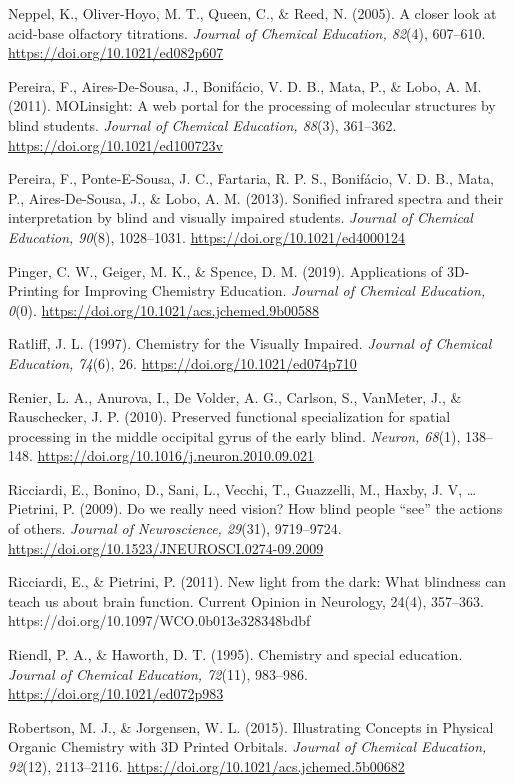 \documentclass[11.5pt]{sig-alternate} %
\begin{document}
Neppel, K., Oliver-Hoyo, M. T., Queen, C., \& Reed, N. (2005). A closer look at acid-base olfactory titrations. \textit{Journal of Chemical Education, 82}(4), 607–610. \url{https://doi.org/10.1021/ed082p607}

Pereira, F., Aires-De-Sousa, J., Bonifácio, V. D. B., Mata, P., \& Lobo, A. M. (2011). MOLinsight: A web portal for the processing of molecular structures by blind students. \textit{Journal of Chemical Education, 88}(3), 361–362. \url{https://doi.org/10.1021/ed100723v}

Pereira, F., Ponte-E-Sousa, J. C., Fartaria, R. P. S., Bonifácio, V. D. B., Mata, P., Aires-De-Sousa, J., \& Lobo, A. M. (2013). Sonified infrared spectra and their interpretation by blind and visually impaired students. \textit{Journal of Chemical Education, 90}(8), 1028–1031. \url{https://doi.org/10.1021/ed4000124}

Pinger, C. W., Geiger, M. K., \& Spence, D. M. (2019). Applications of 3D-Printing for Improving Chemistry Education. \textit{Journal of Chemical Education, 0}(0). \url{https://doi.org/10.1021/acs.jchemed.9b00588}

Ratliff, J. L. (1997). Chemistry for the Visually Impaired. \textit{Journal of Chemical Education, 74}(6), 26. \url{https://doi.org/10.1021/ed074p710}

Renier, L. A., Anurova, I., De Volder, A. G., Carlson, S., VanMeter, J., \& Rauschecker, J. P. (2010). Preserved functional specialization for spatial processing in the middle occipital gyrus of the early blind. \textit{Neuron, 68}(1), 138–148. \url{https://doi.org/10.1016/j.neuron.2010.09.021}

Ricciardi, E., Bonino, D., Sani, L., Vecchi, T., Guazzelli, M., Haxby, J. V, … Pietrini, P. (2009). Do we really need vision? How blind people “see” the actions of others. \textit{Journal of Neuroscience, 29}(31), 9719–9724. \url{https://doi.org/10.1523/JNEUROSCI.0274-09.2009}

Ricciardi, E., \& Pietrini, P. (2011). New light from the dark: What blindness can teach us about brain function. Current Opinion in Neurology, 24(4), 357–363. https://doi.org/10.1097/WCO.0b013e328348bdbf

Riendl, P. A., \& Haworth, D. T. (1995). Chemistry and special education. \textit{Journal of Chemical Education, 72}(11), 983–986. \url{https://doi.org/10.1021/ed072p983}

Robertson, M. J., \& Jorgensen, W. L. (2015). Illustrating Concepts in Physical Organic Chemistry with 3D Printed Orbitals. \textit{Journal of Chemical Education, 92}(12), 2113–2116. \url{https://doi.org/10.1021/acs.jchemed.5b00682}
\end{document}
